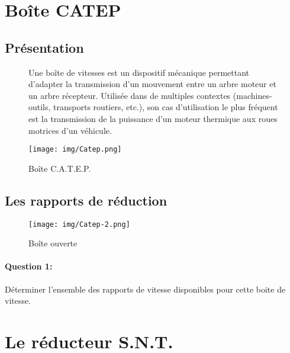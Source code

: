 

\section{Boîte CATEP}

\subsection{Présentation}

\begin{figure}[!h]
\begin{minipage}{0.6\linewidth}
Une boîte de vitesses est un dispositif mécanique permettant d'adapter la transmission d'un mouvement entre un arbre moteur et un arbre récepteur. Utilisée dans de multiples contextes (machines-outils, transports routiers, etc.), son cas d'utilisation le plus fréquent est la transmission de la puissance d'un moteur thermique aux roues motrices d'un véhicule.
\end{minipage}
 \hfill
\begin{minipage}{0.35\linewidth}
 \centering\texttt{[image: img/Catep.png]}
 \caption{Boîte C.A.T.E.P.}
 \label{fig1}
\end{minipage}
\end{figure}

\subsection{Les rapports de réduction}

\begin{figure}[!h]
 \centering\texttt{[image: img/Catep-2.png]}
 \caption{Boîte ouverte}
 \label{fig2}
\end{figure}

\paragraph{Question 1:} Déterminer l'ensemble des rapports de vitesse disponibles pour cette boite de vitesse.





\newpage

\section{Le réducteur S.N.T.}

